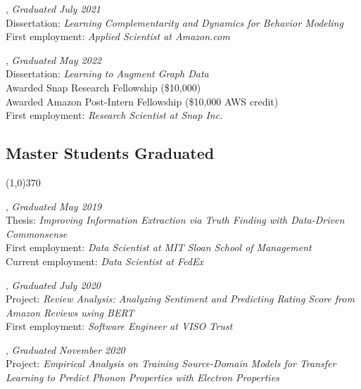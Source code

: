 \documentclass[10pt]{article}
\newenvironment{myindentpar}[1]%
{\begin{list}{}%
         {\setlength{\leftmargin}{#1}}%
         \item[]%
}
{\end{list}}
\newcounter{list}
\begin{document}
\begin{myindentpar}{0.75cm}

\hspace{-0.75cm}{\bf Daheng Wang}, \textit{Graduated July 2021} \\
	{Dissertation: \textit{Learning Complementarity and Dynamics for Behavior Modeling}} \\
	{First employment: \textit{Applied Scientist at Amazon.com}}

\hspace{-0.75cm}{\bf Tong Zhao}, \textit{Graduated May 2022} \\
	{Dissertation: \textit{Learning to Augment Graph Data}} \\
	{Awarded Snap Research Fellowship (\$10,000)} \\
	{Awarded Amazon Post-Intern Fellowship (\$10,000 AWS credit)} \\
	{First employment: \textit{Research Scientist at Snap Inc.}}

\end{myindentpar}
	
\subsection{\sc Master Students Graduated}
\vspace{-0.4cm} \line(1,0){370} \vspace{-0.1cm}

\begin{myindentpar}{0.75cm}

\hspace{-0.75cm}{\bf Ms. Xueying Wang}, \textit{Graduated May 2019} \\
	{Thesis: \textit{Improving Information Extraction via Truth Finding with Data-Driven Commonsense}} \\
	{First employment: \textit{Data Scientist at MIT Sloan School of Management}} \\
	{Current employment: \textit{Data Scientist at FedEx}}

\hspace{-0.75cm}{\bf Ms. Bhakti Sharma}, \textit{Graduated July 2020} \\
	{Project: \textit{Review Analysis: Analyzing Sentiment and Predicting Rating Score from Amazon Reviews using BERT}} \\
	{First employment: \textit{Software Engineer at VISO Trust}}

\hspace{-0.75cm}{\bf Jianing Li}, \textit{Graduated November 2020} \\
	{Project: \textit{Empirical Analysis on Training Source-Domain Models for Transfer Learning to Predict Phonon Properties with Electron Properties}}

\end{myindentpar}
\end{document}
